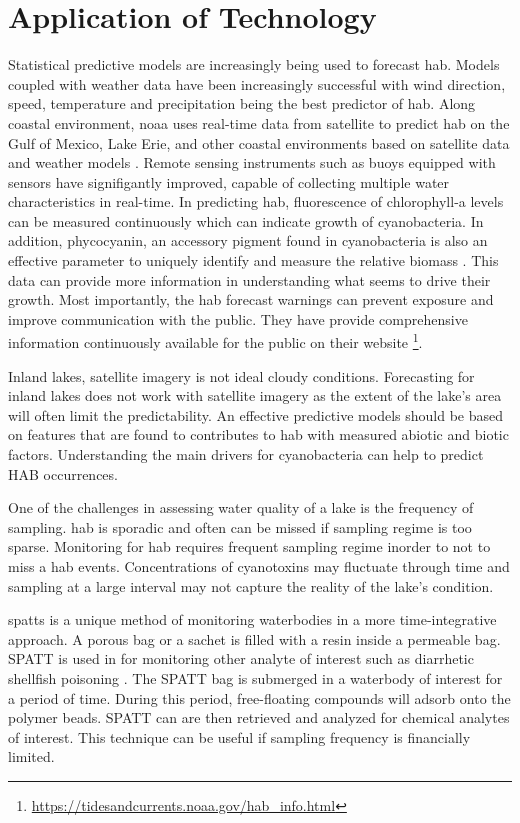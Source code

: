 \section{Application of Technology}
Statistical predictive models are increasingly being used to forecast \gls{hab}. Models coupled with weather data have been increasingly successful with wind direction, speed, temperature and precipitation being the best predictor of \gls{hab}. Along coastal environment,   \gls{noaa} uses real-time data from satellite to predict \gls{hab} on the Gulf of Mexico, Lake Erie, and other coastal environments based on satellite data and weather models \cite{kavanaugh_assessment_2013}. Remote sensing instruments such as buoys equipped with sensors have signifigantly improved, capable of collecting multiple water characteristics in real-time. In predicting \gls{hab}, fluorescence of chlorophyll-a levels can be measured continuously which can indicate growth of cyanobacteria. In addition, phycocyanin, an accessory pigment found in cyanobacteria is also an effective parameter to uniquely identify and measure the relative biomass \cite{ahn_rainfall_2002,li_semi-analytical_2012}. This data can provide more information in understanding what seems to drive their growth. Most importantly, the \gls{hab} forecast warnings can prevent exposure and improve communication with the public. They have provide comprehensive information continuously available for the public on their website \footnote{\url{https://tidesandcurrents.noaa.gov/hab_info.html}}. 

Inland lakes, satellite imagery is not ideal cloudy conditions. Forecasting for inland lakes does not work with satellite imagery as the extent of the lake's area will often limit the predictability. An effective predictive models should be based on features that are found to contributes to \gls{hab} with measured abiotic and biotic factors. Understanding the main drivers for cyanobacteria can help to predict HAB occurrences.

One of the challenges in assessing water quality of a lake is the frequency of sampling. \gls{hab} is sporadic and often can be missed if sampling regime is too sparse. Monitoring for \gls{hab} requires frequent sampling regime inorder to not to miss a  \gls{hab} events. Concentrations of cyanotoxins may fluctuate through time and sampling at a large interval may not capture the reality of the lake's condition. 

\gls{spatts} is a unique method of monitoring waterbodies in a more time-integrative approach. A porous bag or a sachet is filled with a resin inside a permeable bag.
SPATT is used in for monitoring other analyte of interest such as diarrhetic shellfish poisoning \cite{mackenzie_solid_2004}. %
The SPATT bag  is submerged in a waterbody of interest for a period of time. During this period, free-floating compounds will adsorb onto the polymer beads.  SPATT can are then retrieved and analyzed for chemical analytes of interest. This technique can be useful if sampling frequency is financially limited.




